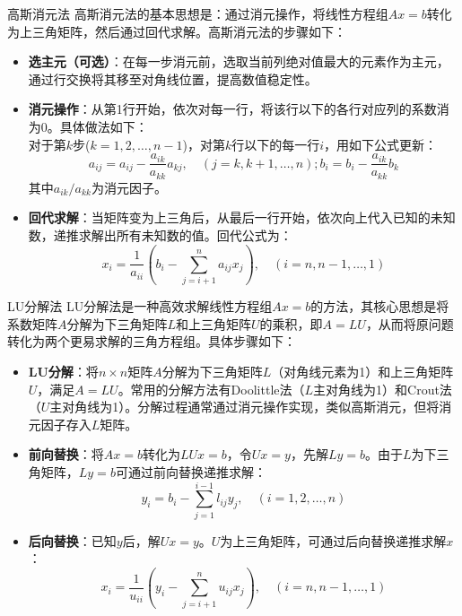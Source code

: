 \documentclass[UTF8,aspectratio=169]{beamer}
\begin{document}
\begin{frame}{高斯消元法}
    高斯消元法的基本思想是：通过消元操作，将线性方程组$Ax=b$转化为上三角矩阵，然后通过回代求解。高斯消元法的步骤如下：
    \begin{itemize}
        \item \textbf{选主元（可选）}：在每一步消元前，选取当前列绝对值最大的元素作为主元，通过行交换将其移至对角线位置，提高数值稳定性。
        \item \textbf{消元操作}：从第1行开始，依次对每一行，将该行以下的各行对应列的系数消为0。具体做法如下：\\
        对于第$k$步($k=1,2,\ldots,n-1$)，对第$k$行以下的每一行$i$，用如下公式更新：
        \[
            a_{ij} = a_{ij} - \frac{a_{ik}}{a_{kk}} a_{kj}, \quad (j=k,k+1,\ldots,n); b_i = b_i - \frac{a_{ik}}{a_{kk}} b_k
        \]
        其中$a_{ik}/a_{kk}$为消元因子。
        \item \textbf{回代求解}：当矩阵变为上三角后，从最后一行开始，依次向上代入已知的未知数，递推求解出所有未知数的值。回代公式为：
        \[
            x_i = \frac{1}{a_{ii}} \left( b_i - \sum_{j=i+1}^{n} a_{ij} x_j \right), \quad (i=n,n-1,\ldots,1)
        \]
    \end{itemize}
\end{frame}

\begin{frame}{LU分解法}
    LU分解法是一种高效求解线性方程组$Ax=b$的方法，其核心思想是将系数矩阵$A$分解为下三角矩阵$L$和上三角矩阵$U$的乘积，即$A=LU$，从而将原问题转化为两个更易求解的三角方程组。具体步骤如下：
    \begin{itemize}
        \item \textbf{LU分解}：将$n\times n$矩阵$A$分解为下三角矩阵$L$（对角线元素为1）和上三角矩阵$U$，满足$A=LU$。常用的分解方法有Doolittle法（$L$主对角线为1）和Crout法（$U$主对角线为1）。分解过程通常通过消元操作实现，类似高斯消元，但将消元因子存入$L$矩阵。
        \item \textbf{前向替换}：将$Ax=b$转化为$LUx=b$，令$Ux=y$，先解$Ly=b$。由于$L$为下三角矩阵，$Ly=b$可通过前向替换递推求解：
        \[
            y_i = b_i - \sum_{j=1}^{i-1} l_{ij}y_j, \quad (i=1,2,\ldots,n)
        \]
        \item \textbf{后向替换}：已知$y$后，解$Ux=y$。$U$为上三角矩阵，可通过后向替换递推求解$x$：
        \[
            x_i = \frac{1}{u_{ii}}\left(y_i - \sum_{j=i+1}^{n} u_{ij}x_j\right), \quad (i=n,n-1,\ldots,1)
        \]
    \end{itemize}
\end{frame}
\end{document}
